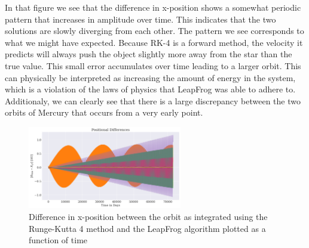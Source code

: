 In that figure we see that the difference in x-position shows a somewhat periodic pattern that increases in amplitude over time. This indicates that the two solutions are slowly diverging from each other. The pattern we see corresponds to what we might have expected. Because RK-4 is a forward method, the velocity it predicts will always push the object slightly more away from the star than the true value. This small error accumulates over time leading to a larger orbit. This can physically be interpreted as increasing the amount of energy in the system, which is a violation of the laws of physics that LeapFrog was able to adhere to. Additionaly, we can clearly see that there is a large discrepancy between the two orbits of Mercury that occurs from a very early point.

\begin{figure}
    \centering
    \includegraphics[width=0.6\textwidth]{results/rk4_lf_diff.png}
    \caption{Difference in x-position between the orbit as integrated using the Runge-Kutta 4 method and the LeapFrog algorithm plotted as a function of time}
    \label{fig:orbits_diff}
\end{figure}









